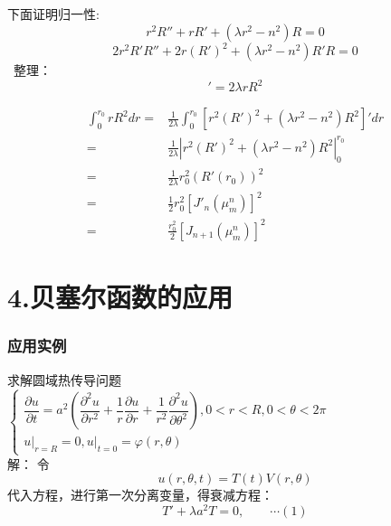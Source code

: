 \begin{frame}
	下面证明归一性:
	\begin{equation*}
		r^2 R''+r R' +(\lambda r^2 -n^2)R=0 
	\end{equation*}	
	\begin{equation*}
		2r^2 R'R''+2r (R')^2 +(\lambda r^2 -n^2)R'R=0 
	\end{equation*}	
	 整理：
	\begin{equation*}
		[r^2 (R')^2 + (\lambda r^2 -n^2)R^2]'=2 \lambda rR^2
	\end{equation*}	
\end{frame}	

\begin{frame}
	\begin{equation*}
		\begin{split}
			\int_0 ^{r_0} r R^2 dr =& \frac{1}{2\lambda} \int_0 ^{r_0} [r^2 (R')^2 + (\lambda r^2 -n^2)R^2]' dr  \\
			=& \frac{1}{2\lambda} |r^2 (R')^2 + (\lambda r^2 -n^2)R^2 |_0 ^{r_0} \\
			=& \frac{1}{2\lambda} r_0^2 (R'(r_0))^2 \\
			=& \frac{1}{2} r_0^2 [J'_n(\mu_m ^n)]^2 \\
			=& \frac{r_0^2}{2} [J_{n+1}(\mu_m ^n)]^2
		\end{split}
	\end{equation*}	
\end{frame}	

\section{4.贝塞尔函数的应用}
\begin{frame}
	\frametitle{应用实例}
	求解圆域热传导问题 \\
	$\left\{
		\begin{array}{l}
		\dfrac{\partial u}{\partial t}=a^{2}\left(\dfrac{\partial^{2} u}{\partial r^{2}}+\dfrac{1}{r} 
		\dfrac{\partial u}{\partial r}+\dfrac{1}{r^{2}} \dfrac{\partial^{2} u}{\partial \theta^{2}}\right), 0<r<R, 0<\theta<2 \pi \\
		\left. u\right|_{r=R}=0,\left.u\right|_{t=0}=\varphi(r, \theta)
	\end{array}
	\right. $\\
	\alert{解：} 令 
	\begin{equation*}
		u(r,\theta,t)= T(t) V(r, \theta) 
	\end{equation*}	
	代入方程，进行第一次分离变量，得衰减方程：\[T'+\lambda a^2 T=0, \qquad \cdots (1) \]	
\end{frame}

